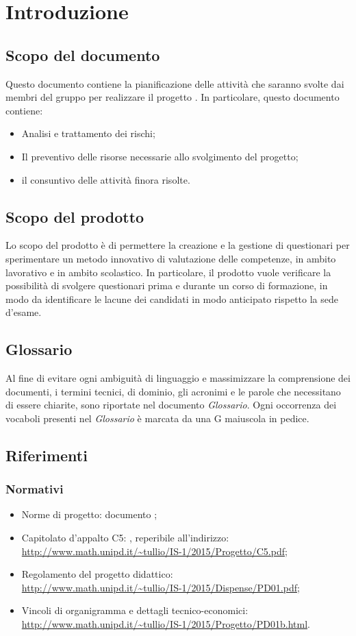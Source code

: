 \section{Introduzione}
\subsection{Scopo del documento}
Questo documento contiene la pianificazione delle attività che saranno svolte dai membri del gruppo \gruppo per realizzare il progetto \progetto. In particolare, questo documento contiene:

	\begin{itemize}
		\item Analisi e trattamento dei rischi;
		\item Il preventivo delle risorse necessarie allo svolgimento del progetto;
		\item il consuntivo delle attività finora risolte.
	\end{itemize}
	
\subsection{Scopo del prodotto}
Lo scopo del prodotto è di permettere la creazione e la gestione di questionari per sperimentare un metodo innovativo di valutazione delle competenze, in ambito lavorativo e in ambito scolastico. In particolare, il prodotto vuole verificare la possibilità di svolgere questionari prima e durante un corso di formazione, in modo da identificare le lacune dei candidati in modo anticipato rispetto la sede d'esame.
\subsection{Glossario}
Al fine di evitare ogni ambiguità di linguaggio e massimizzare la comprensione dei documenti, i termini tecnici, di dominio, gli acronimi e le parole che necessitano di essere chiarite, sono riportate nel documento \textit{Glossario}. Ogni occorrenza dei vocaboli presenti nel \textit{Glossario} è marcata da una G maiuscola in pedice.
\subsection{Riferimenti}
\subsubsection{Normativi}
	\begin{itemize}
		\item Norme di progetto: documento \textit{\NdP};
		\item Capitolato d'appalto C5: \textit{\progetto}, reperibile all'indirizzo:\\
		\url{http://www.math.unipd.it/~tullio/IS-1/2015/Progetto/C5.pdf};
		\item Regolamento del progetto didattico:\\
		\url{http://www.math.unipd.it/~tullio/IS-1/2015/Dispense/PD01.pdf};
		\item Vincoli di organigramma e dettagli tecnico-economici:
		\url{http://www.math.unipd.it/~tullio/IS-1/2015/Progetto/PD01b.html}.
	\end{itemize}
